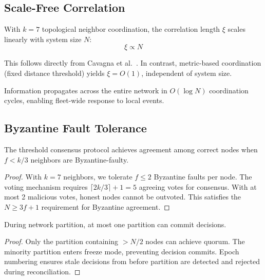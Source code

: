 \subsection{Scale-Free Correlation}

\begin{theorem}
With $k=7$ topological neighbor coordination, the correlation length $\xi$ scales linearly with system size $N$:
\begin{equation}
\xi \propto N
\end{equation}
\end{theorem}

This follows directly from Cavagna et al.~\cite{cavagna2010scale}. In contrast, metric-based coordination (fixed distance threshold) yields $\xi = O(1)$, independent of system size.

\begin{corollary}
Information propagates across the entire network in $O(\log N)$ coordination cycles, enabling fleet-wide response to local events.
\end{corollary}

\subsection{Byzantine Fault Tolerance}

\begin{theorem}
The threshold consensus protocol achieves agreement among correct nodes when $f < k/3$ neighbors are Byzantine-faulty.
\end{theorem}

\begin{proof}
With $k=7$ neighbors, we tolerate $f \leq 2$ Byzantine faults per node. The voting mechanism requires $\lceil 2k/3 \rceil + 1 = 5$ agreeing votes for consensus. With at most 2 malicious votes, honest nodes cannot be outvoted. This satisfies the $N \geq 3f + 1$ requirement for Byzantine agreement.
\end{proof}

\begin{theorem}
During network partition, at most one partition can commit decisions.
\end{theorem}

\begin{proof}
Only the partition containing $> N/2$ nodes can achieve quorum. The minority partition enters freeze mode, preventing decision commits. Epoch numbering ensures stale decisions from before partition are detected and rejected during reconciliation.
\end{proof}

